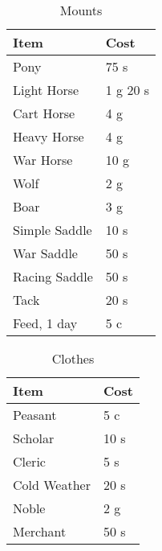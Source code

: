 \begin{table}[ht]
	\centering
	\caption{Mounts}
	\begin{tabular}{|l|l|}
		\hline
		Item & Cost\\ [0.5ex]
		\hline
		Pony & 75 s\\
		Light Horse & 1 g 20 s\\
		Cart Horse & 4 g\\
		Heavy Horse & 4 g\\
		War Horse & 10 g\\
		Wolf & 2 g\\
		Boar & 3 g\\
		\hline
		Simple Saddle & 10 s\\
		War Saddle & 50 s\\
		Racing Saddle & 50 s\\
		Tack & 20 s\\
		Feed, 1 day & 5 c\\
		\hline
	\end{tabular}
\end{table}

\begin{table}[ht]
	\centering
	\caption{Clothes}
	\begin{tabular}{|l|l|}
		\hline
		Item & Cost\\ [0.5ex]
		\hline
		Peasant & 5 c\\
		Scholar & 10 s\\
		Cleric & 5 s\\
		Cold Weather & 20 s\\
		Noble & 2 g\\
		Merchant & 50 s\\
		\hline
	\end{tabular}
\end{table}
